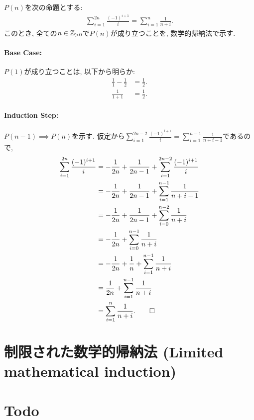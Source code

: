 \begin{proof*}
  $P(n)$を次の命題とする:
  \begin{align*}
    \sum_{i=1}^{2n}\frac{(-1)^{i+1}}{i}=\sum_{i=1}^n\frac{1}{n+i}.
  \end{align*}
  このとき,
  全ての$n\in\mathbb{Z}_{>0}$で$P(n)$が成り立つことを,
  数学的帰納法で示す.

  \paragraph{Base Case:}
  $P(1)$が成り立つことは, 以下から明らか:
  \begin{align*}
    \frac{1}{1}-\frac{1}{2}&=\frac{1}{2}.\\
    \frac{1}{1+1}&=\frac{1}{2}.
  \end{align*}

  \paragraph{Induction Step:}
  $P(n-1)\implies P(n)$を示す.
  仮定から$\sum_{i=1}^{2n-2}\frac{(-1)^{i+1}}{i}=\sum_{i=1}^{n-1}\frac{1}{n+i-1}$であるので,
  \begin{align*}
    \sum_{i=1}^{2n}\frac{(-1)^{i+1}}{i}
    &=-\frac{1}{2n}+\frac{1}{2n-1}+\sum_{i=1}^{2n-2}\frac{(-1)^{i+1}}{i}\\
    &=-\frac{1}{2n}+\frac{1}{2n-1}+\sum_{i=1}^{n-1}\frac{1}{n+i-1}\\
    &=-\frac{1}{2n}+\frac{1}{2n-1}+\sum_{i=0}^{n-2}\frac{1}{n+i}\\
    &=-\frac{1}{2n}+\sum_{i=0}^{n-1}\frac{1}{n+i}\\
    &=-\frac{1}{2n}+\frac{1}{n}+\sum_{i=1}^{n-1}\frac{1}{n+i}\\
    &=\frac{1}{2n}+\sum_{i=1}^{n-1}\frac{1}{n+i}\\
    &=\sum_{i=1}^{n}\frac{1}{n+i}
    .\qedhere
  \end{align*}
\end{proof*}


\section{制限された数学的帰納法 (Limited mathematical induction)}


\section{Todo}







